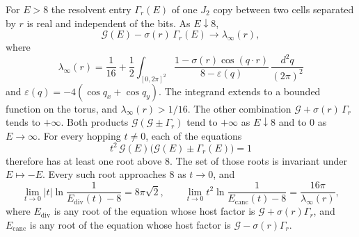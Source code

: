 \begin{proposition}
\label{prop:anysep}
For \(E>8\) the resolvent entry \(\Gamma_r(E)\) of one \(J_2\) copy between
two cells separated by \(r\) is real and independent of the bits.
As \(E\downarrow 8\),
\[
\mathcal{G}(E)-\sigma(r)\,\Gamma_r(E)
\to\lambda_\infty(r),
\]
where
\begin{equation}
\label{eq:lamr}
\lambda_\infty(r)
=\frac{1}{16}
+\frac12\int_{[0,2\pi]^2}
\frac{1-\sigma(r)\cos(q\cdot r)}{8-\varepsilon(q)}
\,\frac{d^2q}{(2\pi)^2}
\end{equation}
and \(\varepsilon(q)=-4(\cos q_x+\cos q_y)\).
The integrand extends to a bounded function on the torus, and
\(\lambda_\infty(r)>1/16\).
The other combination \(\mathcal{G}+\sigma(r)\,\Gamma_r\) tends to \(+\infty\).
Both products \(\mathcal{G}(\mathcal{G}\pm\Gamma_r)\) tend to \(+\infty\) as
\(E\downarrow 8\) and to \(0\) as \(E\to\infty\).
For every hopping \(t\neq 0\), each of the equations
\begin{equation}
\label{eq:anysep}
t^2\,\mathcal{G}(E)\bigl(\mathcal{G}(E)\pm\Gamma_r(E)\bigr)=1
\end{equation}
therefore has at least one root above \(8\).
The set of those roots is invariant under \(E\mapsto -E\).
Every such root approaches \(8\) as \(t\to 0\), and
\begin{equation}
\label{eq:rlog}
\lim_{t\to 0}
|t|\ln\frac{1}{E_{\mathrm{div}}(t)-8}
=8\pi\sqrt{2},
\qquad
\lim_{t\to 0}
t^2\ln\frac{1}{E_{\mathrm{canc}}(t)-8}
=\frac{16\pi}{\lambda_\infty(r)},
\end{equation}
where \(E_{\mathrm{div}}\) is any root of the equation whose host factor is
\(\mathcal{G}+\sigma(r)\Gamma_r\), and \(E_{\mathrm{canc}}\) is any root of
the equation whose host factor is \(\mathcal{G}-\sigma(r)\Gamma_r\).
\end{proposition}

